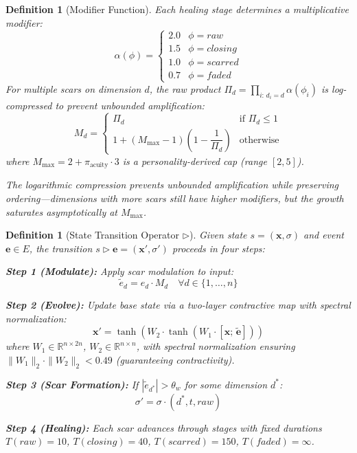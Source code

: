 \documentclass[11pt]{article}
\newtheorem{definition}[theorem]{Definition}
\begin{document}
\begin{definition}[Modifier Function]
\label{def:modifier}
Each healing stage determines a multiplicative modifier:
\begin{equation}
\alpha(\phi) = \begin{cases} 2.0 & \phi = raw \\ 1.5 & \phi = closing \\ 1.0 & \phi = scarred \\ 0.7 & \phi = faded \end{cases}
\end{equation}
For multiple scars on dimension $d$, the raw product $\Pi_d = \prod_{i:\, d_i = d} \alpha(\phi_i)$ is log-compressed to prevent unbounded amplification:
\begin{equation}
M_d = \begin{cases}
\Pi_d & \text{if } \Pi_d \leq 1 \\[4pt]
1 + (M_{\max} - 1)\left(1 - \dfrac{1}{\Pi_d}\right) & \text{otherwise}
\end{cases}
\end{equation}
where $M_{\max} = 2 + \pi_{\text{acuity}} \cdot 3$ is a personality-derived cap (range $[2, 5]$).

The logarithmic compression prevents unbounded amplification while preserving ordering---dimensions with more scars still have higher modifiers, but the growth saturates asymptotically at $M_{\max}$.
\end{definition}

\begin{definition}[State Transition Operator $\triangleright$]
\label{def:transition}
Given state $s = (\mathbf{x}, \sigma)$ and event $\mathbf{e} \in E$, the transition $s \triangleright \mathbf{e} = (\mathbf{x}', \sigma')$ proceeds in four steps:

\textbf{Step 1 (Modulate):} Apply scar modulation to input:
\begin{equation}
\tilde{e}_d = e_d \cdot M_d \quad \forall d \in \{1, \ldots, n\}
\end{equation}

\textbf{Step 2 (Evolve):} Update base state via a two-layer contractive map with spectral normalization:
\begin{equation}
\mathbf{x}' = \tanh(W_2 \cdot \tanh(W_1 \cdot [\mathbf{x};\, \tilde{\mathbf{e}}]))
\end{equation}
where $W_1 \in \mathbb{R}^{n \times 2n}$, $W_2 \in \mathbb{R}^{n \times n}$, with spectral normalization ensuring $\|W_1\|_2 \cdot \|W_2\|_2 < 0.49$ (guaranteeing contractivity).

\textbf{Step 3 (Scar Formation):} If $|\tilde{e}_{d^*}| > \theta_w$ for some dimension $d^*$:
\begin{equation}
\sigma' = \sigma \cdot (d^*, t, raw)
\end{equation}

\textbf{Step 4 (Healing):} Each scar advances through stages with fixed durations $T(raw)=10$, $T(closing)=40$, $T(scarred)=150$, $T(faded)=\infty$.
\end{definition}
\end{document}
